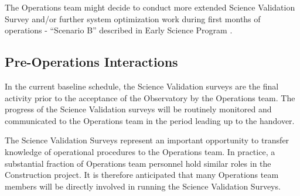 The Operations team might decide to conduct more extended Science Validation Survey and/or further system optimization work during first months of operations - ``Scenario B'' described in Early Science Program .


\subsection{Pre-Operations Interactions}

In the current baseline schedule, the Science Validation surveys are the final activity prior to the acceptance of the Observatory by the Operations team.
The progress of the Science Validation surveys will be routinely monitored and communicated to the Operations team in the period leading up to the handover.

The Science Validation Surveys represent an important opportunity to transfer knowledge of operational procedures to the Operations team.
In practice, a substantial fraction of Operations team personnel hold similar roles in the Construction project.
It is therefore anticipated that many Operations team members will be directly involved in running the Science Validation Surveys.



